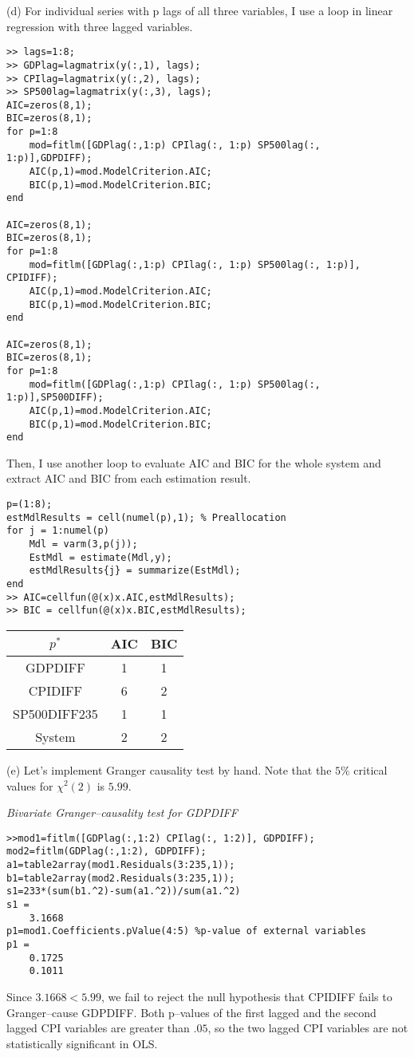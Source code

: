 \documentclass[11pt]{article}
\begin{document}
\bigskip
(d) For individual series with p lags of all three variables, I use a loop in linear regression with three lagged variables.
\begin{lstlisting}
>> lags=1:8;
>> GDPlag=lagmatrix(y(:,1), lags);
>> CPIlag=lagmatrix(y(:,2), lags);
>> SP500lag=lagmatrix(y(:,3), lags);
AIC=zeros(8,1);
BIC=zeros(8,1);
for p=1:8
    mod=fitlm([GDPlag(:,1:p) CPIlag(:, 1:p) SP500lag(:, 1:p)],GDPDIFF);
    AIC(p,1)=mod.ModelCriterion.AIC;
    BIC(p,1)=mod.ModelCriterion.BIC;
end

AIC=zeros(8,1);
BIC=zeros(8,1);
for p=1:8
    mod=fitlm([GDPlag(:,1:p) CPIlag(:, 1:p) SP500lag(:, 1:p)], CPIDIFF);
    AIC(p,1)=mod.ModelCriterion.AIC;
    BIC(p,1)=mod.ModelCriterion.BIC;
end

AIC=zeros(8,1);
BIC=zeros(8,1);
for p=1:8
    mod=fitlm([GDPlag(:,1:p) CPIlag(:, 1:p) SP500lag(:, 1:p)],SP500DIFF);
    AIC(p,1)=mod.ModelCriterion.AIC;
    BIC(p,1)=mod.ModelCriterion.BIC;
end

\end{lstlisting}
Then, I use another loop to evaluate AIC and BIC for the whole system and extract AIC and BIC from each estimation result.
\begin{lstlisting}
p=(1:8);
estMdlResults = cell(numel(p),1); % Preallocation
for j = 1:numel(p)
    Mdl = varm(3,p(j));
    EstMdl = estimate(Mdl,y);
    estMdlResults{j} = summarize(EstMdl);
end
>> AIC=cellfun(@(x)x.AIC,estMdlResults);
>> BIC = cellfun(@(x)x.BIC,estMdlResults);
\end{lstlisting}
\begin{center}
\begin{tabular}{ |c|c|c|}
 \hline
  $p^*$ & AIC & BIC \\ 
  \hline
 GDPDIFF & 1 & 1 \\ 
 CPIDIFF & 6 & 2\\ 
 SP500DIFF235 & 1 & 1\\
  \hline
  System & 2 & 2\\
\hline
\end{tabular}
\end{center}

\bigskip
(e) Let's implement Granger causality test by hand. Note that the $5\%$ critical values for $\chi^2(2)$ is $5.99$.

\bigskip
\noindent \textit{Bivariate Granger--causality test for GDPDIFF}
\begin{lstlisting}
>>mod1=fitlm([GDPlag(:,1:2) CPIlag(:, 1:2)], GDPDIFF);
mod2=fitlm(GDPlag(:,1:2), GDPDIFF);
a1=table2array(mod1.Residuals(3:235,1));
b1=table2array(mod2.Residuals(3:235,1));
s1=233*(sum(b1.^2)-sum(a1.^2))/sum(a1.^2)
s1 =
    3.1668
p1=mod1.Coefficients.pValue(4:5) %p-value of external variables
p1 =
    0.1725
    0.1011
\end{lstlisting}
Since $3.1668<5.99$, we fail to reject the null hypothesis that CPIDIFF fails to Granger--cause GDPDIFF. Both p--values of the first lagged and the second lagged CPI variables are greater than $.05$, so the two lagged CPI variables are not statistically significant in OLS.
\end{document}
